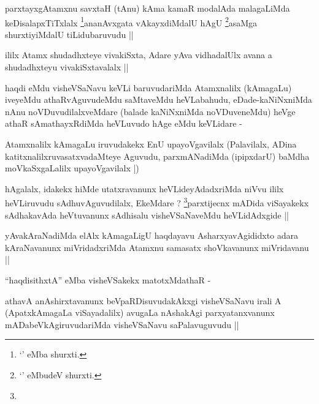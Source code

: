 \begin{artha}
parxtayxgAtamxnu savxtaH (tAnu) kAma kamaR modalAda malagaLiMda
keDisalapxTiTxlalx \footnote{`\stext' eMba shurxti.}ananAvxgata vAkayxdiMdalU
hAgU \footnote{`\stext' eMbudeV shurxti.}asaMga shurxtiyiMdalU tiLidubaruvudu ||
\end{artha}


\begin{artha}
ililx Atamx shudadhxteye vivakiSxta, Adare yAva vidhadalUlx avana a
shudadhxteyu vivakiSxtavalalx ||
\end{artha}


\begin{artha}
haqdi eMdu visheVSaNavu keVLi baruvudariMda Atamxnalilx
(kAmagaLu) iveyeMdu athaRvAguvudeMdu saMtaveMdu heVLabahudu,
eDade-kaNiNxniMda nAnu noVDuvudilalxveMdare (balade kaNiNxniMda
noVDuveneMdu) heVge athaR sAmathayxRdiMda heVLuvudo hAge eMdu
keVLidare -
\end{artha}


\begin{artha}
Atamxnalilx kAmagaLu iruvudakekx EnU upayoVgavilalx (Palavilalx, ADina
katitxnalilxruvasatxvadaMteye Aguvudu, parxmANadiMda (ipipxdarU)
baMdha moVkaSxgaLalilx upayoVgavilalx |)
\end{artha}

\begin{artha}
hAgalalx, idakekx hiMde utatxravanunx heVLideyAdadxriMda niVvu ililx
heVLiruvudu sAdhuvAguvudilalx, EkeMdare ? \footnote{}parxtijecnx
mADida viSayakekx sAdhakavAda heVtuvanunx sAdhisalu visheVSaNaveMdu
heVLidAdxgide ||
\end{artha}


\begin{artha}
yAvakAraNadiMda elAlx kAmagaLigU haqdayavu AsharxyavAgididxto adara
kAraNavanunx miVridadxriMda Atamxnu samasatx shoVkavanunx miVridavanu ||
\end{artha}

``haqdisithxtA''  eMba visheVSakekx matotxMdathaR -

\begin{artha}
athavA anAshirxtavanunx beVpaRDisuvudakAkxgi visheVSaNavu irali A
(ApatxkAmagaLa viSayadalilx) avugaLa nAshakAgi parxyatanxvanunx
mADabeVkAgiruvudariMda visheVSaNavu saPalavuguvudu ||
\end{artha}

